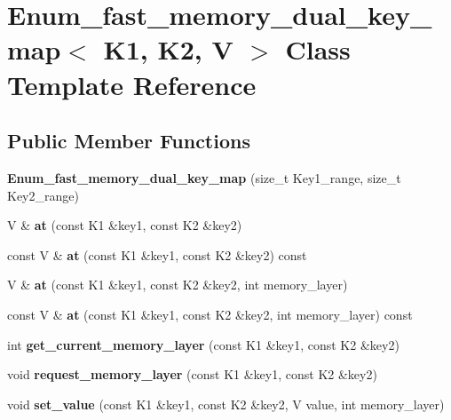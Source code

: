 \hypertarget{classEnum__fast__memory__dual__key__map}{}\section{Enum\+\_\+fast\+\_\+memory\+\_\+dual\+\_\+key\+\_\+map$<$ K1, K2, V $>$ Class Template Reference}
\label{classEnum__fast__memory__dual__key__map}
\subsection*{Public Member Functions}
\begin{DoxyCompactItemize}
\item 
\mbox{\label{classEnum__fast__memory__dual__key__map_afb889a057c074d008532fe1fa0704b0a}} 
{\bfseries Enum\+\_\+fast\+\_\+memory\+\_\+dual\+\_\+key\+\_\+map} (size\+\_\+t Key1\+\_\+range, size\+\_\+t Key2\+\_\+range)
\item 
\mbox{\label{classEnum__fast__memory__dual__key__map_a7aba17d70cb0b8004b454e82771549c0}} 
V \& {\bfseries at} (const K1 \&key1, const K2 \&key2)
\item 
\mbox{\label{classEnum__fast__memory__dual__key__map_a2518eb2505797947a18c69beda721847}} 
const V \& {\bfseries at} (const K1 \&key1, const K2 \&key2) const
\item 
\mbox{\label{classEnum__fast__memory__dual__key__map_aecd818e7cb5f99e1f303615497f80ef9}} 
V \& {\bfseries at} (const K1 \&key1, const K2 \&key2, int memory\+\_\+layer)
\item 
\mbox{\label{classEnum__fast__memory__dual__key__map_a273fa837cbfbac1f7ab330c129491d0f}} 
const V \& {\bfseries at} (const K1 \&key1, const K2 \&key2, int memory\+\_\+layer) const
\item 
\mbox{\label{classEnum__fast__memory__dual__key__map_a85e18af081ac4c8958209136b2e24c9d}} 
int {\bfseries get\+\_\+current\+\_\+memory\+\_\+layer} (const K1 \&key1, const K2 \&key2)
\item 
\mbox{\label{classEnum__fast__memory__dual__key__map_ab08f89c97cf8a8f375c41f38b72b7e96}} 
void {\bfseries request\+\_\+memory\+\_\+layer} (const K1 \&key1, const K2 \&key2)
\item 
\mbox{\label{classEnum__fast__memory__dual__key__map_ae0e1bd6f97ffe1ada461fe929ce87175}} 
void {\bfseries set\+\_\+value} (const K1 \&key1, const K2 \&key2, V value, int memory\+\_\+layer)
\end{DoxyCompactItemize}
